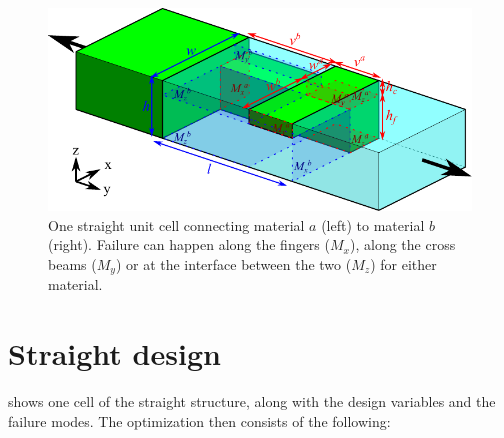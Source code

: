 
\begin{figure}[H]
	\centering
	\includegraphics[width=\columnwidth]{sources/method/straight_model_v3.pdf}
	\caption{
		One straight unit cell connecting material $a$ (left) to material $b$ (right).
		Failure can happen along the fingers ($M_x$), along the cross beams ($M_y$) or at the interface between the two ($M_z$) for either material.}
	\label{fig:failure_modes}
\end{figure}


\section{Straight design}

 shows one cell of the straight structure, along with the design variables and the failure modes.
The optimization then consists of the following:

